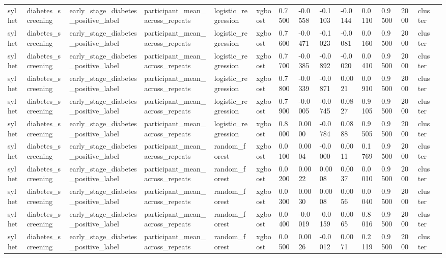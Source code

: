 \begin{tabular}{lllllllllllllll}
sylhet & diabetes\_screening & early\_stage\_diabetes\_positive\_label & participant\_mean\_across\_repeats & logistic\_regression & xgboost & 0.7500 & -0.0558 & -0.1103 & -0.0144 & 0.0110 & 0.9500 & 2000 & cluster &  \\
sylhet & diabetes\_screening & early\_stage\_diabetes\_positive\_label & participant\_mean\_across\_repeats & logistic\_regression & xgboost & 0.7600 & -0.0471 & -0.1023 & -0.0081 & 0.0160 & 0.9500 & 2000 & cluster &  \\
sylhet & diabetes\_screening & early\_stage\_diabetes\_positive\_label & participant\_mean\_across\_repeats & logistic\_regression & xgboost & 0.7700 & -0.0385 & -0.0892 & -0.0020 & 0.0410 & 0.9500 & 2000 & cluster &  \\
sylhet & diabetes\_screening & early\_stage\_diabetes\_positive\_label & participant\_mean\_across\_repeats & logistic\_regression & xgboost & 0.7800 & -0.0339 & -0.0871 & 0.0021 & 0.0910 & 0.9500 & 2000 & cluster &  \\
sylhet & diabetes\_screening & early\_stage\_diabetes\_positive\_label & participant\_mean\_across\_repeats & logistic\_regression & xgboost & 0.7900 & -0.0005 & -0.0745 & 0.0827 & 0.9105 & 0.9500 & 2000 & cluster &  \\
sylhet & diabetes\_screening & early\_stage\_diabetes\_positive\_label & participant\_mean\_across\_repeats & logistic\_regression & xgboost & 0.8000 & 0.0000 & -0.0784 & 0.0888 & 0.9505 & 0.9500 & 2000 & cluster &  \\
sylhet & diabetes\_screening & early\_stage\_diabetes\_positive\_label & participant\_mean\_across\_repeats & random\_forest & xgboost & 0.0100 & 0.0004 & -0.0000 & 0.0011 & 0.1769 & 0.9500 & 2000 & cluster &  \\
sylhet & diabetes\_screening & early\_stage\_diabetes\_positive\_label & participant\_mean\_across\_repeats & random\_forest & xgboost & 0.0200 & 0.0022 & 0.0008 & 0.0037 & 0.0010 & 0.9500 & 2000 & cluster &  \\
sylhet & diabetes\_screening & early\_stage\_diabetes\_positive\_label & participant\_mean\_across\_repeats & random\_forest & xgboost & 0.0300 & 0.0030 & 0.0008 & 0.0056 & 0.0040 & 0.9500 & 2000 & cluster &  \\
sylhet & diabetes\_screening & early\_stage\_diabetes\_positive\_label & participant\_mean\_across\_repeats & random\_forest & xgboost & 0.0400 & -0.0019 & -0.0159 & 0.0065 & 0.8016 & 0.9500 & 2000 & cluster &  \\
sylhet & diabetes\_screening & early\_stage\_diabetes\_positive\_label & participant\_mean\_across\_repeats & random\_forest & xgboost & 0.0500 & 0.0026 & -0.0012 & 0.0071 & 0.2119 & 0.9500 & 2000 & cluster &  \\

\end{tabular}
